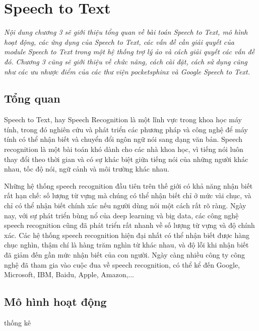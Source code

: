 \chapter{Speech to Text}
\ifpdf
    \graphicspath{{Chapter3/Chapter3Figs/PNG/}{Chapter3/Chapter3Figs/PDF/}{Chapter3/Chapter3Figs/}}
\else
    \graphicspath{{Chapter3/Chapter3Figs/EPS/}{Chapter3/Chapter3Figs/}}
\fi

\textit{Nội dung chương 3 sẽ giới thiệu tổng quan về bài toán Speech to Text, mô hình hoạt động, các ứng dụng của Speech to Text, các vấn đề cần giải quyết của module Speech to Text trong một hệ thống trợ lý ảo và cách giải quyết các vấn đề đó. Chương 3 cũng sẽ giới thiệu về chức năng, cách cài đặt, cách sử dụng cũng như các ưu nhược điểm của các thư viện pocketsphinx và Google Speech to Text.}

\section{Tổng quan}

Speech to Text, hay Speech Recognition là một lĩnh vực trong khoa học máy tính, trong đó nghiên cứu và phát triển các phương pháp và công nghệ để máy tính có thể nhận biết và chuyển đổi ngôn ngữ nói sang dạng văn bản. Speech recognition là một bài toán khó dành cho các nhà khoa học, vì tiếng nói luôn thay đổi theo thời gian và có sự khác biệt giữa tiếng nói của những người khác nhau, tốc độ nói, ngữ cảnh và môi trường khác nhau.

Những hệ thống speech recognition đầu tiên trên thế giới có khả năng nhận biết rất hạn chế: số lượng từ vựng mà chúng có thể nhận biết chỉ ở mức vài chục, và chỉ có thể nhận biết chính xác nếu người dùng nói một cách rất rõ ràng. Ngày nay, với sự phát triển bùng nổ của deep learning và big data, các công nghệ speech recognition cũng đã phát triển rất nhanh về số lượng từ vựng và độ chính xác. Các hệ thống speech recognition hiện đại nhất có thể nhận biết được hàng chục nghìn, thậm chí là hàng trăm nghìn từ khác nhau, và độ lỗi khi nhận biết đã giảm đến gần mức nhận biết của con người. Ngày càng nhiều công ty công nghệ đã tham gia vào cuộc đua về speech recognition, có thể kể đến Google, Microsoft, IBM, Baidu, Apple, Amazon,...

\section{Mô hình hoạt động}

thống kê

